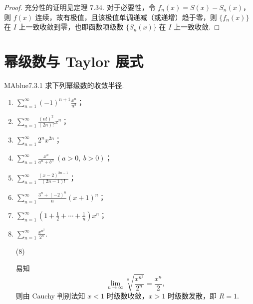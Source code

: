 \begin{proof}
    充分性的证明见定理 7.34. 对于必要性，令 $f_n(x) = S(x) - S_n(x)$，则 $f(x)$ 连续，故有极值，且该极值单调递减（或递增）趋于零，则 $\{ f_n(x) \}$ 在 $I$ 上一致收敛到零，也即函数项级数 $\{ S_n(x) \}$ 在 $I$ 上一致收敛.
\end{proof}

\section{幂级数与 Taylor 展式}

\begin{problem}{MAblue}{7.3.1}
    求下列幂级数的收敛半径.
    \begin{multicols}{2}
        \begin{enumerate}[label={(\arabic*)}]
            \item $\displaystyle \sum_{n=1}^\infty (-1)^{n+1} \frac{x^n}{n^2}$；
            \item $\displaystyle \sum_{n=1}^\infty \frac{(n!)^2}{(2n)!} x^n$；
            \item $\displaystyle \sum_{n=1}^\infty 2^nx^{2n}$；
            \item $\displaystyle \sum_{n=1}^\infty \frac{x^n}{a^n+b^n} \ (a > 0,\ b > 0)$；
            \item $\displaystyle \sum_{n=1}^\infty \frac{(x-2)^{2n-1}}{(2n-1)!}$；
            \item $\displaystyle \sum_{n=1}^\infty \frac {3^n+(-2)^n} n (x+1)^n$；
            \item $\displaystyle \sum_{n=1}^\infty \left( 1 + \frac 1 2 + \cdots + \frac 1 n \right) x^n$；
            \item $\displaystyle \sum_{n=1}^\infty \frac{x^{n^2}}{2^n}$.
        \end{enumerate}
    \end{multicols}
\end{problem}

\begin{enumerate}
    \item[(8)]
    \begin{solution}
        易知
        \[
            \lim_{n \to \infty} \sqrt[n]{\frac{x^{n^2}}{2^n}} = \frac {x^n} 2,
        \]
        则由 Cauchy 判别法知 $x < 1$ 时级数收敛，$x > 1$ 时级数发散，即 $R = 1$.
    \end{solution}
\end{enumerate}

